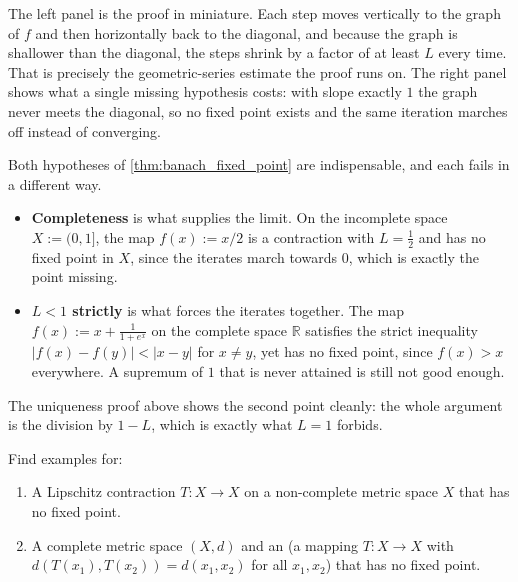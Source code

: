 The left panel is the proof in miniature. Each step moves vertically to the graph of $f$ and then
horizontally back to the diagonal, and because the graph is shallower than the diagonal, the steps
shrink by a factor of at least $L$ every time. That is precisely the geometric-series estimate the
proof runs on. The right panel shows what a single missing hypothesis costs: with slope exactly
$1$ the graph never meets the diagonal, so no fixed point exists and the same iteration marches
off instead of converging.

\begin{remark}
\label{rem:banach_hypotheses}
Both hypotheses of \cref{thm:banach_fixed_point} are indispensable, and each fails in a
different way.
\begin{itemize}
  \item \textbf{Completeness} is what supplies the limit. On the incomplete space
    $X := (0,1]$, the map $f(x) := x/2$ is a contraction with $L=\tfrac12$ and has no fixed
    point in $X$, since the iterates march towards $0$, which is exactly the point missing.
  \item \textbf{$L<1$ strictly} is what forces the iterates together. The map
    $f(x) := x + \tfrac{1}{1+e^{x}}$ on the complete space $\mathbb{R}$ satisfies the strict
    inequality $|f(x)-f(y)| < |x-y|$ for $x \neq y$, yet has no fixed point, since
    $f(x)>x$ everywhere. A supremum of $1$ that is never attained is still not good enough.
\end{itemize}
The uniqueness proof above shows the second point cleanly: the whole argument is the division by
$1-L$, which is exactly what $L=1$ forbids.
\end{remark}

\begin{exercise}
\label{ex:banach_hypotheses_sharp}
Find examples for:
\begin{enumerate}[label=\textbf{(\alph*)}]
  \item A Lipschitz contraction $T : X \to X$ on a non-complete metric space $X$ that has no
    fixed point.
  \item A complete metric space $(X,d)$ and an  (a mapping $T : X \to X$ with
    $d(T(x_1),T(x_2)) = d(x_1,x_2)$ for all $x_1,x_2$) that has no fixed point.
\end{enumerate}
\end{exercise}

